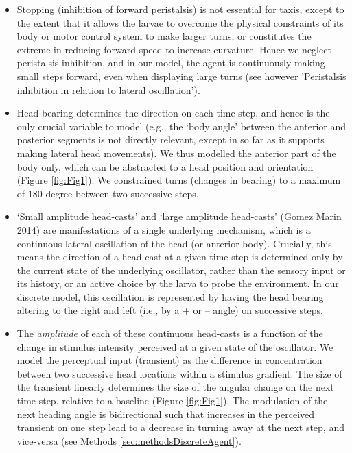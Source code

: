 \documentclass[10pt,a4paper]{article}
\begin{document}
\begin{itemize}
\item Stopping (inhibition of forward peristalsis) is not essential for taxis, except to the extent that it allows the larvae to overcome the physical constraints of its body or motor control system to make larger turns, or constitutes the extreme in reducing forward speed to increase curvature. Hence we neglect peristalsis inhibition, and in our model, the agent is continuously making small steps forward, even when displaying large turns (see however 'Peristalsis inhibition in relation to lateral oscillation').
\item Head bearing determines the direction on each time step, and hence is the only crucial variable to model (e.g., the ‘body angle’ between the anterior and posterior segments is not directly relevant, except in so far as it supports making lateral head movements). We thus modelled the anterior part of the body only, which can be abstracted to a head position and orientation (Figure \ref{fig:Fig1}). We constrained turns (changes in bearing) to a maximum of 180 degree between two successive steps.
\item ‘Small amplitude head-casts’ and ‘large amplitude head-casts’ (Gomez Marin 2014) are manifestations of a single underlying mechanism, which is a continuous lateral oscillation of the head (or anterior body). Crucially, this means the direction of a head-cast at a given time-step is determined only by the current state of the underlying oscillator, rather than the sensory input or its history, or an active choice by the larva to probe the environment. In our discrete model, this oscillation is represented by having the head bearing altering to the right and left (i.e., by a + or – angle) on successive steps. 
\item The {\it amplitude} of each of these continuous head-casts is a function of the change in stimulus intensity perceived at a given state of the oscillator. We model the perceptual input (transient) as the difference in concentration between two successive head locations within a stimulus gradient. The size of the transient linearly determines the size of the angular change on the next time step, relative to a baseline (Figure \ref{fig:Fig1}). The modulation of the next heading angle is bidirectional such that increases in the perceived transient on one step lead to a decrease in turning away at the next step, and vice-versa (see Methods \ref{sec:methodsDiscreteAgent}). 
\end{itemize}
\end{document}
